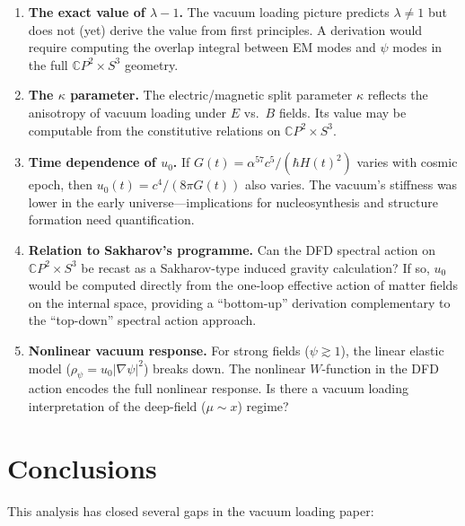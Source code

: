 \documentclass[11pt]{article}
\newcommand{\CP}{\mathbb{C}P}
\theoremstyle{plain}
\theoremstyle{definition}
\theoremstyle{remark}
\begin{document}
\begin{enumerate}
\item \textbf{The exact value of $\lambda - 1$.}
The vacuum loading picture predicts $\lambda \neq 1$ but does not
(yet) derive the value from first principles. A derivation would
require computing the overlap integral between EM modes and $\psi$ modes
in the full $\CP^2 \times S^3$ geometry.

\item \textbf{The $\kappa$ parameter.}
The electric/magnetic split parameter $\kappa$ reflects the
anisotropy of vacuum loading under $E$ vs.\ $B$ fields. Its value
may be computable from the constitutive relations on $\CP^2 \times S^3$.

\item \textbf{Time dependence of $u_0$.}
If $G(t) = \alpha^{57}c^5/(\hbar H(t)^2)$ varies with cosmic epoch,
then $u_0(t) = c^4/(8\pi G(t))$ also varies. The vacuum's stiffness
was lower in the early universe---implications for nucleosynthesis and
structure formation need quantification.

\item \textbf{Relation to Sakharov's programme.}
Can the DFD spectral action on $\CP^2 \times S^3$ be recast as a
Sakharov-type induced gravity calculation? If so, $u_0$ would be
computed directly from the one-loop effective action of matter fields
on the internal space, providing a ``bottom-up'' derivation
complementary to the ``top-down'' spectral action approach.

\item \textbf{Nonlinear vacuum response.}
For strong fields ($\psi \gtrsim 1$), the linear elastic model
($\rho_\psi = u_0 |\nabla\psi|^2$) breaks down. The nonlinear
$W$-function in the DFD action encodes the full nonlinear response.
Is there a vacuum loading interpretation of the deep-field
($\mu \sim x$) regime?
\end{enumerate}


\section{Conclusions}
\label{sec:conclusions}

This analysis has closed several gaps in the vacuum loading paper:
\end{document}
